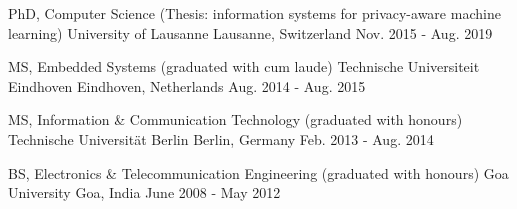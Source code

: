 

\begin{cventries}

  	\vspace{-0.1cm}
    \cventry
    {PhD, Computer Science (Thesis: information systems for privacy-aware machine learning)} %
    {University of Lausanne} %
    {Lausanne, Switzerland} %
    {Nov. 2015 - Aug. 2019} %
    {}
    
    \vspace{-0.3cm}
    \cventry
    {MS, Embedded Systems (graduated with cum laude)}
    {Technische Universiteit Eindhoven}
    {Eindhoven, Netherlands}
    {Aug. 2014 - Aug. 2015}
    {}
	
	\vspace{-0.3cm}
    \cventry
    {MS, Information \& Communication Technology (graduated with honours)} %
    {Technische Universität Berlin} %
    {Berlin, Germany} %
    {Feb. 2013 - Aug. 2014} %
    {}
	
	\vspace{-0.3cm}
    \cventry
    {BS, Electronics \& Telecommunication Engineering (graduated with honours)} %
    {Goa University} %
    {Goa, India} %
    {June 2008 - May 2012} %
    {}
	
	\vspace{-0.9cm}
\end{cventries}
